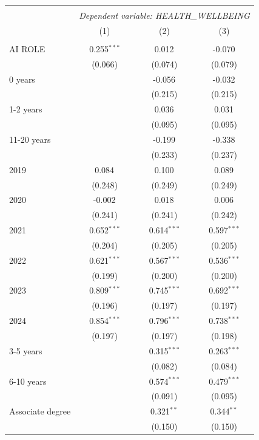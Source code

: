 \begin{table}[!htbp] \centering
\begin{tabular}{@{\extracolsep{5pt}}lccc}
\\[-1.8ex]\hline
\hline \\[-1.8ex]
& \multicolumn{3}{c}{\textit{Dependent variable: HEALTH_WELLBEING}} \
\cr \cline{2-4}
\\[-1.8ex] & (1) & (2) & (3) \\
\hline \\[-1.8ex]
 AI ROLE & 0.255$^{***}$ & 0.012$^{}$ & -0.070$^{}$ \\
& (0.066) & (0.074) & (0.079) \\
 0 years & & -0.056$^{}$ & -0.032$^{}$ \\
& & (0.215) & (0.215) \\
 1-2 years & & 0.036$^{}$ & 0.031$^{}$ \\
& & (0.095) & (0.095) \\
 11-20 years & & -0.199$^{}$ & -0.338$^{}$ \\
& & (0.233) & (0.237) \\
 2019 & 0.084$^{}$ & 0.100$^{}$ & 0.089$^{}$ \\
& (0.248) & (0.249) & (0.249) \\
 2020 & -0.002$^{}$ & 0.018$^{}$ & 0.006$^{}$ \\
& (0.241) & (0.241) & (0.242) \\
 2021 & 0.652$^{***}$ & 0.614$^{***}$ & 0.597$^{***}$ \\
& (0.204) & (0.205) & (0.205) \\
 2022 & 0.621$^{***}$ & 0.567$^{***}$ & 0.536$^{***}$ \\
& (0.199) & (0.200) & (0.200) \\
 2023 & 0.809$^{***}$ & 0.745$^{***}$ & 0.692$^{***}$ \\
& (0.196) & (0.197) & (0.197) \\
 2024 & 0.854$^{***}$ & 0.796$^{***}$ & 0.738$^{***}$ \\
& (0.197) & (0.197) & (0.198) \\
 3-5 years & & 0.315$^{***}$ & 0.263$^{***}$ \\
& & (0.082) & (0.084) \\
 6-10 years & & 0.574$^{***}$ & 0.479$^{***}$ \\
& & (0.091) & (0.095) \\
 Associate degree & & 0.321$^{**}$ & 0.344$^{**}$ \\
& & (0.150) & (0.150) \\

\end{tabular}
\end{table}
